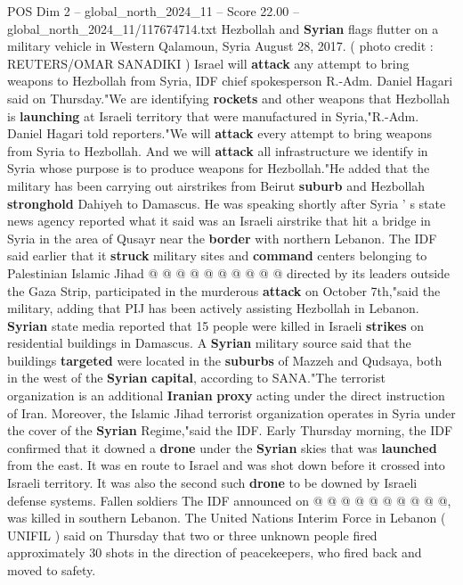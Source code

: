 \begin{textsample}{POS Dim 2 – global\_north\_2024\_11 – Score 22.00 – global\_north\_2024\_11/117674714.txt}  \label{ex:f2_pos_257}
Hezbollah and \textbf{Syrian} flags flutter on a military vehicle in Western Qalamoun, Syria August 28, 2017. ( photo credit : REUTERS/OMAR SANADIKI ) Israel will \textbf{attack} any attempt to bring weapons to Hezbollah from Syria, IDF chief spokesperson R.-Adm.
Daniel Hagari said on Thursday."We are identifying \textbf{rockets} and other weapons that Hezbollah is \textbf{launching} at Israeli territory that were manufactured in Syria,"R.-Adm.
Daniel Hagari told reporters."We will \textbf{attack} every attempt to bring weapons from Syria to Hezbollah.
And we will \textbf{attack} all infrastructure we identify in Syria whose purpose is to produce weapons for Hezbollah."He added that the military has been carrying out airstrikes from Beirut \textbf{suburb} and Hezbollah \textbf{stronghold} Dahiyeh to Damascus.
He was speaking shortly after Syria ' s state news agency reported what it said was an Israeli airstrike that hit a bridge in Syria in the area of Qusayr near the \textbf{border} with northern Lebanon.
The IDF said earlier that it \textbf{struck} military sites and \textbf{command} centers belonging to Palestinian Islamic Jihad @ @ @ @ @ @ @ @ @ @ directed by its leaders outside the Gaza Strip, participated in the murderous \textbf{attack} on October 7th,"said the military, adding that PIJ has been actively assisting Hezbollah in Lebanon. \textbf{Syrian} state media reported that 15 people were killed in Israeli \textbf{strikes} on residential buildings in Damascus.
A \textbf{Syrian} military source said that the buildings \textbf{targeted} were located in the \textbf{suburbs} of Mazzeh and Qudsaya, both in the west of the \textbf{Syrian} \textbf{capital}, according to SANA."The terrorist organization is an additional \textbf{Iranian} \textbf{proxy} acting under the direct instruction of Iran.
Moreover, the Islamic Jihad terrorist organization operates in Syria under the cover of the \textbf{Syrian} Regime,"said the IDF.
Early Thursday morning, the IDF confirmed that it downed a \textbf{drone} under the \textbf{Syrian} skies that was \textbf{launched} from the east.
It was en route to Israel and was shot down before it crossed into Israeli territory.
It was also the second such \textbf{drone} to be downed by Israeli defense systems.
Fallen soldiers The IDF announced on @ @ @ @ @ @ @ @ @ @, was killed in southern Lebanon.
The United Nations Interim Force in Lebanon ( UNIFIL ) said on Thursday that two or three unknown people fired approximately 30 shots in the direction of peacekeepers, who fired back and moved to safety.

\end{textsample}
